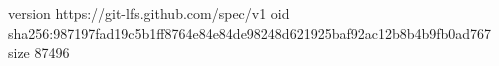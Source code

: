 version https://git-lfs.github.com/spec/v1
oid sha256:987197fad19c5b1ff8764e84e84de98248d621925baf92ac12b8b4b9fb0ad767
size 87496
